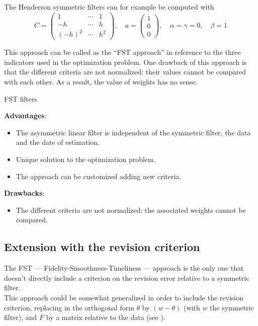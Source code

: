 \documentclass[
  12pt,
  ,
  a4paper]{article}
\providecommand{\tightlist}{%
  \setlength{\itemsep}{0pt}\setlength{\parskip}{0pt}}
\newcommand\1{\mathds{1}}
\begin{document}
The Henderson symmetric filters can for example be computed with
\[C=\begin{pmatrix}
1 & \cdots&1\\
-h & \cdots&h \\
(-h)^2 & \cdots&h^2
\end{pmatrix},\quad
a=\begin{pmatrix}
1 \\0\\0
\end{pmatrix},\quad
\alpha=\gamma=0,\quad
\beta=1\]

This approach can be called as the ``FST approach'' in reference to the three indicators used in the optimization problem.
One drawback of this approach is that the different criteria are not normalized: their values cannot be compared with each other.
As a result, the value of weights has no sense.

\begin{summary_box}{FST filters}

\textbf{Advantages}:

\begin{itemize}
\item
  The asymmetric linear filter is independent of the symmetric filter, the data and the date of estimation.
\item
  Unique solution to the optimization problem.
\item
  The approach can be customized adding new criteria.
\end{itemize}

\textbf{Drawbacks}:

\begin{itemize}
\tightlist
\item
  The different criteria are not normalized: the associated weights cannot be compared.
\end{itemize}

\end{summary_box}

\hypertarget{extension-with-the-revision-criterion}{%
\subsection{Extension with the revision criterion}\label{extension-with-the-revision-criterion}}

The FST --- Fidelity-Smoothness-Timeliness --- approach is the only one that doesn't directly include a criterion on the revision error relative to a symmetric filter.\\
This approach could be somewhat generalized in order to include the revision criterion, replacing in the orthogonal form \(\theta\) by \((w-\theta)\) (with \(w\) the symmetric filter), and \(F\) by a matrix relative to the data (see \textcite{ch12HBSA}).
\end{document}
